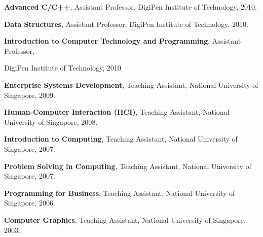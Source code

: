 \documentclass[10pt,a4paper]{article}
\renewenvironment{itemize}{
  \begin{list}{}{
    \setlength{\leftmargin}{1.5em}
    \setlength{\itemsep}{0.25em}
    \setlength{\parskip}{0pt}
    \setlength{\parsep}{0.25em}
  }
}{
  \end{list}
}
\begin{document}
\begin{itemize}
    \item \textbf{Advanced C/C++},
        Assistant Professor, DigiPen Institute of Technology,
        2010.

    \item \textbf{Data Structures},
        Assistant Professor, DigiPen Institute of Technology,
        2010.

    \item \textbf{Introduction to Computer Technology and Programming},
        Assistant Professor, 

        DigiPen Institute of Technology,
        2010.

    \item \textbf{Enterprise Systems Development},
        Teaching Assistant, National University of Singapore,
        2009.

    \item \textbf{Human-Computer Interaction (HCI)},
        Teaching Assistant, National University of Singapore,
        2008.

    \item \textbf{Introduction to Computing},
        Teaching Assistant, National University of Singapore,
        2007.

    \item \textbf{Problem Solving in Computing},
        Teaching Assistant, National University of Singapore,
        2007.

    \item \textbf{Programming for Business},
        Teaching Assistant, National University of Singapore,
        2006.

    \item \textbf{Computer Graphics},
        Teaching Assistant, National University of Singapore,
        2003.

\end{itemize}

\end{document}
